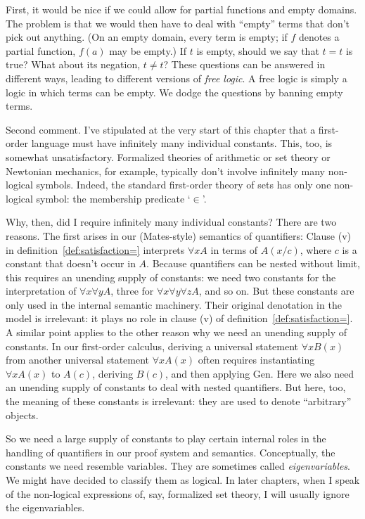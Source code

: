 First,
it would be nice if we could allow for partial functions and empty domains.
The problem is that
we would then have to deal with ``empty'' terms that don't pick out anything.
(On an empty domain,
every term is empty;
if $f$ denotes a partial function, $f(a)$ may be empty.)
If $t$ is empty,
should we say that $t=t$ is true?
What about its negation, $t\not=t$?
These questions can be answered in different ways,
leading to different versions of \emph{free logic}.
A free logic is simply a logic in which terms can be empty.
We dodge the questions by banning empty terms.

Second comment.
I've stipulated at the very start of this chapter that
a first-order language must have infinitely many individual constants.
This,
too,
is somewhat unsatisfactory.
Formalized theories of arithmetic or set theory or Newtonian mechanics,
for example,
typically don't involve infinitely many non-logical symbols.
Indeed,
the standard first-order theory of sets has only one non-logical symbol:
the membership predicate `$\in$'.

Why, then, did I require infinitely many individual constants?
There are two reasons.
The first arises in our (Mates-style) semantics of quantifiers:
Clause (v) in definition~\ref{def:satisfaction=}
interprets $\forall x A$ in terms of $A(x/c)$,
where $c$ is a constant that doesn't occur in $A$.
Because quantifiers can be nested without limit,
this requires an unending supply of constants:
we need two constants for the interpretation of $\forall x \forall y A$,
three for $\forall x \forall y \forall z A$,
and so on.
But these constants are only used in the internal semantic machinery.
Their original denotation in the model is irrelevant:
it plays no role in clause (v) of definition~\ref{def:satisfaction=}.
A similar point applies to the other reason why we need an unending supply of constants.
In our first-order calculus,
deriving a universal statement $\forall x B(x)$ from another universal statement $\forall x A(x)$
often requires instantiating $\forall x A(x)$ to $A(c)$,
deriving $B(c)$,
and then applying Gen.
Here we also need an unending supply of constants
to deal with nested quantifiers.
But here, too, the meaning of these constants is irrelevant:
they are used to denote ``arbitrary'' objects.

So we need a large supply of constants
to play certain internal roles in the handling of quantifiers in our proof system and semantics.
Conceptually,
the constants we need resemble variables.
They are sometimes called \emph{eigenvariables}.
We might have decided to classify them as logical.
In later chapters,
when I speak of the non-logical expressions of, say, formalized set theory,
I will usually ignore the eigenvariables.

